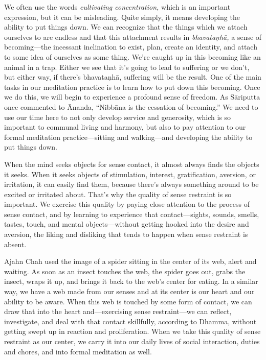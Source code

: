 We often use the words \emph{cultivating concentration,} which is an 
important expression, but it can be misleading. Quite simply, it means 
developing the ability to put things down. We can recognize that the 
things which we attach ourselves to are endless and that this 
attachment results in \emph{bhavataṇhā,} a sense of becoming---the 
incessant inclination to exist, plan, create an identity, and attach to 
some idea of ourselves as some thing. We're caught up in this becoming 
like an animal in a trap. Either we see that it's going to lead to 
suffering or we don't, but either way, if there's bhavataṇhā, 
suffering will be the result. One of the main tasks in our meditation 
practice is to learn how to put down this becoming. Once we do this, we 
will begin to experience a profound sense of freedom. As Sāriputta 
once commented to Ānanda, ``Nibbāna is the cessation of becoming.'' 
We need to use our time here to not only develop service and 
generosity, which is so important to communal living and harmony, but 
also to pay attention to our formal meditation practice---sitting and 
walking---and developing the ability to put things down.


When the mind seeks objects for sense contact, it almost always finds 
the objects it seeks. When it seeks objects of stimulation, interest, 
gratification, aversion, or irritation, it can easily find them, 
because there's always something around to be excited or irritated 
about. That's why the quality of sense restraint is so important. We 
exercise this quality by paying close attention to the process of sense 
contact, and by learning to experience that contact---sights, sounds, 
smells, tastes, touch, and mental objects---without getting hooked into 
the desire and aversion, the liking and disliking that tends to happen 
when sense restraint is absent.

Ajahn Chah used the image of a spider sitting in the center of its web, 
alert and waiting. As soon as an insect touches the web, the spider 
goes out, grabs the insect, wraps it up, and brings it back to the 
web's center for eating. In a similar way, we have a web made from our 
senses and at its center is our heart and our ability to be aware. When 
this web is touched by some form of contact, we can draw that into the 
heart and---exercising sense restraint---we can reflect, investigate, 
and deal with that contact skillfully, according to Dhamma, without 
getting swept up in reaction and proliferation. When we take this 
quality of sense restraint as our center, we carry it into our daily 
lives of social interaction, duties and chores, and into formal 
meditation as well.

